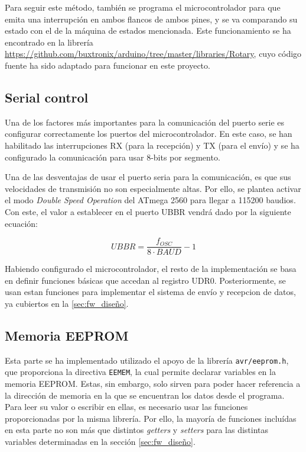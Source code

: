 Para seguir este método, también se programa el microcontrolador para que emita una interrupción en ambos flancos de ambos pines, y se va comparando su estado con el de la máquina de estados mencionada. Este funcionamiento se ha encontrado en la librería \url{https://github.com/buxtronix/arduino/tree/master/libraries/Rotary}, cuyo código fuente ha sido adaptado para funcionar en este proyecto.

\subsection{Serial control}

Una de los factores más importantes para la comunicación del puerto serie es configurar correctamente los puertos del microcontrolador. En este caso, se han habilitado las interrupciones RX (para la recepción) y TX (para el envío) y se ha configurado la comunicación para usar 8-bits por segmento.

Una de las desventajas de usar el puerto seria para la comunicación, es que sus velocidades de transmisión no son especialmente altas. Por ello, se plantea activar el modo \textit{Double Speed Operation} del ATmega 2560 para llegar a 115200 baudios. Con este, el valor a establecer en el puerto UBBR vendrá dado por la siguiente ecuación: \cite{atmega2560}

\begin{center}
    \[UBBR = \frac{f_{OSC}}{8 \cdot BAUD} - 1\]
\end{center}

Habiendo configurado el microcontrolador, el resto de la implementación se basa en definir funciones básicas que accedan al registro UDR0. Posteriormente, se usan estan funciones para implementar el sistema de envío y recepcion de datos, ya cubiertos en la \ref{sec:fw_diseño}.

\subsection{Memoria EEPROM}
\label{sub:fw_eeprom}

Esta parte se ha implementado utilizado el apoyo de la librería \verb|avr/eeprom.h|, que proporciona la directiva \verb|EEMEM|, la cual permite declarar variables en la memoria EEPROM. Estas, sin embargo, solo sirven para poder hacer referencia a la dirección de memoria en la que se encuentran los datos desde el programa. Para leer su valor o escribir en ellas, es necesario usar las funciones proporcionadas por la misma librería. Por ello, la mayoría de funciones incluídas en esta parte no son más que distintos \textit{getters} y \textit{setters} para las distintas variables determinadas en la sección \ref{sec:fw_diseño}.


